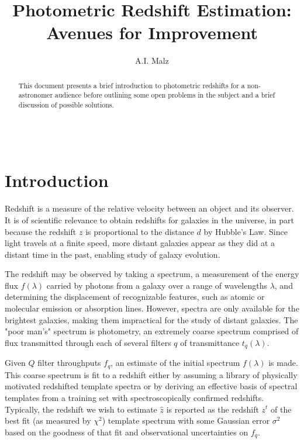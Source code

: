 \documentclass[12pt, onecolumn]{emulateapj}
\begin{document}
\begin{align}
\end{align}

\title{Photometric Redshift Estimation: Avenues for Improvement}

\author{A.I. Malz}

\begin{abstract}
This document presents a brief introduction to photometric redshifts for a non-astronomer audience before outlining some open problems in the subject and a brief discussion of possible solutions.
\end{abstract}


\section{Introduction}
\label{sec:intro}

Redshift is a measure of the relative velocity between an object and its observer.  It is of scientific relevance to obtain redshifts for galaxies in the universe, in part because the redshift $z$ is proportional to the distance $d$ by Hubble's Law.  Since light travels at a finite speed, more distant galaxies appear as they did at a distant time in the past, enabling study of galaxy evolution. 

The redshift may be observed by taking a spectrum, a measurement of the energy flux $f(\lambda)$ carried by photons from a galaxy over a range of wavelengths $\lambda$, and determining the displacement of recognizable features, such as atomic or molecular emission or absorption lines.  However, spectra are only available for the brightest galaxies, making them impractical for the study of distant galaxies.  The "poor man's" spectrum is photometry, an extremely coarse spectrum comprised of flux transmitted through each of several filters $q$ of transmittance $t_{q}(\lambda)$.

Given $Q$ filter throughputs $f_{q}$, an estimate of the initial spectrum $f(\lambda)$ is made.  This coarse spectrum is fit to a redshift either by assuming a library of physically motivated redshifted template spectra or by deriving an effective basis of spectral templates from a training set with spectroscopically confirmed redshifts.  Typically, the redshift we wish to estimate $\hat{z}$ is reported as the redshift $z^{t}$ of the best fit (as measured by $\chi^{2}$) template spectrum with some Gaussian error $\sigma^{2}$ based on the goodness of that fit and observational uncertainties on $f_{q}$.
\end{document}
